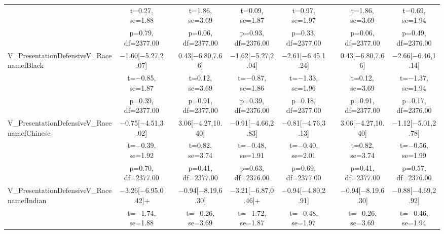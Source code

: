 \documentclass[]{report}
\begin{document}
\begin{table}
{\begin{tabular}[t]{lcccccccc}
		& t=\num{0.27}, se=\num{1.88} &  & t=\num{1.86}, se=\num{3.69} & t=\num{0.09}, se=\num{1.87} & t=\num{0.97}, se=\num{1.97} &  & t=\num{1.86}, se=\num{3.69} & t=\num{0.69}, se=\num{1.94}\\
		& p=\num{0.79}, df=\num{2377.00} &  & p=\num{0.06}, df=\num{2377.00} & p=\num{0.93}, df=\num{2376.00} & p=\num{0.33}, df=\num{2377.00} &  & p=\num{0.06}, df=\num{2377.00} & p=\num{0.49}, df=\num{2376.00}\\
		V\_PresentationDefensiveV\_RacenamefBlack & \num{-1.60}[\num{-5.27},\num{2.07}] &  & \num{0.43}[\num{-6.80},\num{7.66}] & \num{-1.62}[\num{-5.27},\num{2.04}] & \num{-2.61}[\num{-6.45},\num{1.24}] &  & \num{0.43}[\num{-6.80},\num{7.66}] & \num{-2.66}[\num{-6.46},\num{1.14}]\\
		& t=\num{-0.85}, se=\num{1.87} &  & t=\num{0.12}, se=\num{3.69} & t=\num{-0.87}, se=\num{1.86} & t=\num{-1.33}, se=\num{1.96} &  & t=\num{0.12}, se=\num{3.69} & t=\num{-1.37}, se=\num{1.94}\\
		& p=\num{0.39}, df=\num{2377.00} &  & p=\num{0.91}, df=\num{2377.00} & p=\num{0.39}, df=\num{2376.00} & p=\num{0.18}, df=\num{2377.00} &  & p=\num{0.91}, df=\num{2377.00} & p=\num{0.17}, df=\num{2376.00}\\
		V\_PresentationDefensiveV\_RacenamefChinese & \num{-0.75}[\num{-4.51},\num{3.02}] &  & \num{3.06}[\num{-4.27},\num{10.40}] & \num{-0.91}[\num{-4.66},\num{2.83}] & \num{-0.81}[\num{-4.76},\num{3.13}] &  & \num{3.06}[\num{-4.27},\num{10.40}] & \num{-1.12}[\num{-5.01},\num{2.78}]\\
		& t=\num{-0.39}, se=\num{1.92} &  & t=\num{0.82}, se=\num{3.74} & t=\num{-0.48}, se=\num{1.91} & t=\num{-0.40}, se=\num{2.01} &  & t=\num{0.82}, se=\num{3.74} & t=\num{-0.56}, se=\num{1.99}\\
		& p=\num{0.70}, df=\num{2377.00} &  & p=\num{0.41}, df=\num{2377.00} & p=\num{0.63}, df=\num{2376.00} & p=\num{0.69}, df=\num{2377.00} &  & p=\num{0.41}, df=\num{2377.00} & p=\num{0.57}, df=\num{2376.00}\\
		V\_PresentationDefensiveV\_RacenamefIndian & \num{-3.26}[\num{-6.95},\num{0.42}]+ &  & \num{-0.94}[\num{-8.19},\num{6.30}] & \num{-3.21}[\num{-6.87},\num{0.46}]+ & \num{-0.94}[\num{-4.80},\num{2.91}] &  & \num{-0.94}[\num{-8.19},\num{6.30}] & \num{-0.88}[\num{-4.69},\num{2.92}]\\
		& t=\num{-1.74}, se=\num{1.88} &  & t=\num{-0.26}, se=\num{3.69} & t=\num{-1.72}, se=\num{1.87} & t=\num{-0.48}, se=\num{1.97} &  & t=\num{-0.26}, se=\num{3.69} & t=\num{-0.46}, se=\num{1.94}\\

\end{tabular}}
\end{table}
\end{document}
